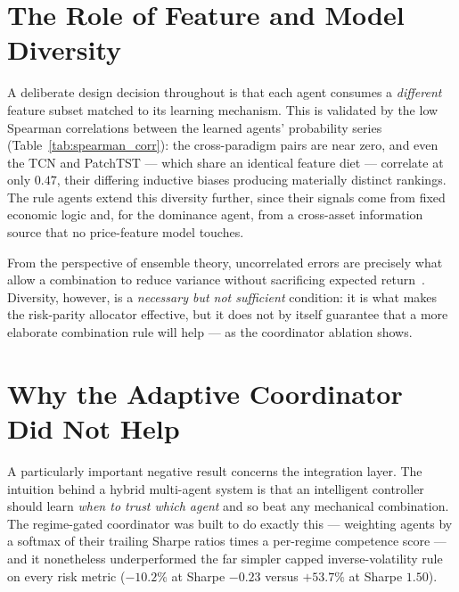 \section{The Role of Feature and Model Diversity}
\label{sec:feature_diversity_discussion}

A deliberate design decision throughout is that each agent consumes a \textit{different} feature subset matched to its learning mechanism. This is validated by the low Spearman correlations between the learned agents' probability series (Table~\ref{tab:spearman_corr}): the cross-paradigm pairs are near zero, and even the TCN and PatchTST --- which share an identical feature diet --- correlate at only $0.47$, their differing inductive biases producing materially distinct rankings. The rule agents extend this diversity further, since their signals come from fixed economic logic and, for the dominance agent, from a cross-asset information source that no price-feature model touches.


From the perspective of ensemble theory, uncorrelated errors are precisely what allow a combination to reduce variance without sacrificing expected return~\cite{dietterich2000ensemble}. Diversity, however, is a \textit{necessary but not sufficient} condition: it is what makes the risk-parity allocator effective, but it does not by itself guarantee that a more elaborate combination rule will help --- as the coordinator ablation shows.

\section{Why the Adaptive Coordinator Did Not Help}
\label{sec:meta_failure}

A particularly important negative result concerns the integration layer. The intuition behind a hybrid multi-agent system is that an intelligent controller should learn \textit{when to trust which agent} and so beat any mechanical combination. The regime-gated coordinator was built to do exactly this --- weighting agents by a softmax of their trailing Sharpe ratios times a per-regime competence score --- and it nonetheless underperformed the far simpler capped inverse-volatility rule on every risk metric ($-10.2\%$ at Sharpe $-0.23$ versus $+53.7\%$ at Sharpe $1.50$).


